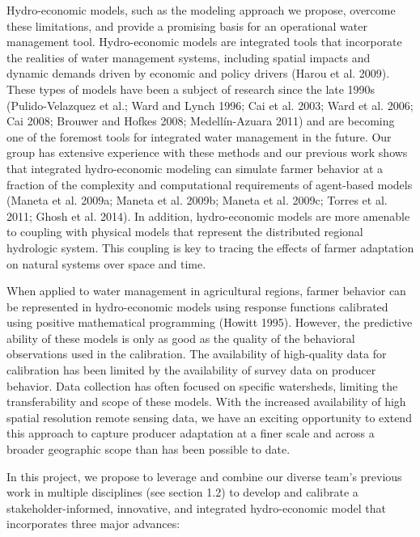 \documentclass[review]{elsarticle}
\begin{document}
Hydro-economic models, such as the modeling approach we propose, overcome these limitations, and provide a promising basis for an operational water management tool. Hydro-economic models are integrated tools that incorporate the realities of water management systems, including spatial impacts and dynamic demands driven by economic and policy drivers (Harou et al. 2009). These types of models have been a subject of research since the late 1990s (Pulido-Velazquez et al.; Ward and Lynch 1996; Cai et al. 2003; Ward et al. 2006; Cai 2008; Brouwer and Hofkes 2008; Medellín-Azuara 2011) and are becoming one of the foremost tools for integrated water management in the future. Our group has extensive experience with these methods and our previous work shows that integrated hydro-economic modeling can simulate farmer behavior at a fraction of the complexity and computational requirements of agent-based models (Maneta et al. 2009a; Maneta et al. 2009b; Maneta et al. 2009c; Torres et al. 2011; Ghosh et al. 2014). In addition, hydro-economic models are more amenable to coupling with physical models that represent the distributed regional hydrologic system. This coupling is key to tracing the effects of farmer adaptation on natural systems over space and time.

When applied to water management in agricultural regions, farmer behavior can be represented in hydro-economic models using response functions calibrated using positive mathematical programming (Howitt 1995). However, the predictive ability of these models is only as good as the quality of the behavioral observations used in the calibration. The availability of high-quality data for calibration has been limited by the availability of survey data on producer behavior. Data collection has often focused on specific watersheds, limiting the transferability and scope of these models. With the increased availability of high spatial resolution remote sensing data, we have an exciting opportunity to extend this approach to capture producer adaptation at a finer scale and across a broader geographic scope than has been possible to date.   

In this project, we propose to leverage and combine our diverse team’s previous work in multiple disciplines (see section 1.2) to develop and calibrate a stakeholder-informed, innovative, and integrated hydro-economic model that incorporates three major advances:
\end{document}
